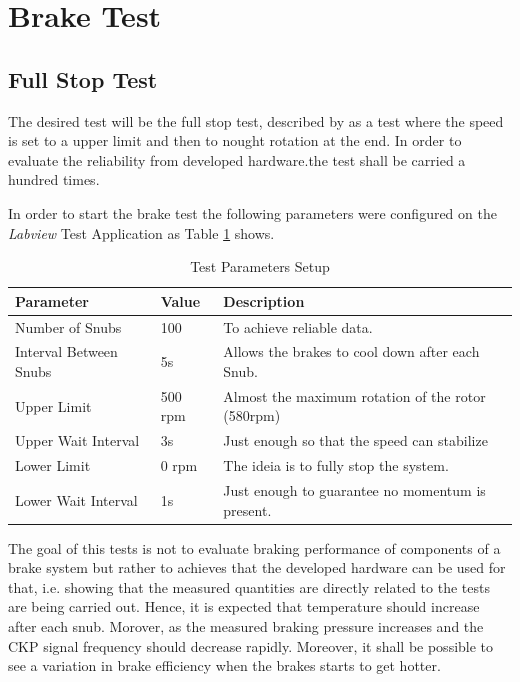 \section{Brake Test}\label{sec:brake-test}

	\subsection{Full Stop Test}\label{ssec:full-stop-test}

		The desired test will be the full stop test, described by \cite{caixeta2017} as a test where the speed is set to a upper limit and then to nought rotation at the end. In order to evaluate the reliability from developed hardware.the test shall be carried a hundred times.

		\par
		In order to start the brake test the following parameters were configured on the \textit{Labview} Test Application as Table \ref{table:brake-test-parameters} shows.

		\begin{table}[h!]
			\begin{tabular}{|l|l|l|}
				\hline
				\textbf{Parameter} & \textbf{Value} & \textbf{Description} \\ \hline
				Number of Snubs & 100 & To achieve reliable data. \\ \hline
				Interval Between Snubs & 5s & Allows the brakes to cool down after each Snub. \\ \hline
				Upper Limit & 500 rpm & Almost the maximum rotation of the rotor (580rpm) \\ \hline
				Upper Wait Interval & 3s & Just enough so that the speed can stabilize \\ \hline
				Lower Limit & 0 rpm & The ideia is to fully stop the system. \\ \hline
				Lower Wait Interval & 1s & Just enough to guarantee no momentum is present. \\ \hline
			\end{tabular}
			\caption{Test Parameters Setup}
			\label{table:brake-test-parameters}
		\end{table}

		The goal of this tests is not to evaluate braking performance of components of a brake system but rather to achieves that the developed hardware can be used for that, i.e. showing that the measured quantities are directly related to the tests are being carried out. Hence, it is expected that temperature should increase after each snub. Morover, as the measured braking pressure increases and the CKP signal frequency should decrease rapidly. Moreover, it shall be possible to see a variation in brake efficiency when the brakes starts to get hotter.

